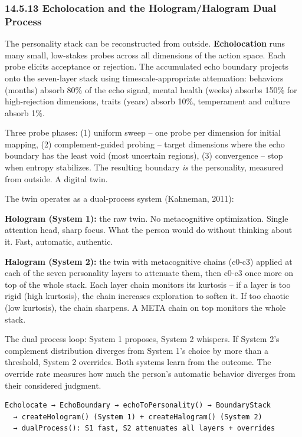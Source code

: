 \documentclass[
  11pt,
]{article}
\begin{document}
\subsubsection{14.5.13 Echolocation and the Hologram/Halogram Dual
Process}\label{echolocation-and-the-hologramhalogram-dual-process}

The personality stack can be reconstructed from outside.
\textbf{Echolocation} runs many small, low-stakes probes across all
dimensions of the action space. Each probe elicits acceptance or
rejection. The accumulated echo boundary projects onto the seven-layer
stack using timescale-appropriate attenuation: behaviors (months) absorb
80\% of the echo signal, mental health (weeks) absorbs 150\% for
high-rejection dimensions, traits (years) absorb 10\%, temperament and
culture absorb 1\%.

Three probe phases: (1) uniform sweep -- one probe per dimension for
initial mapping, (2) complement-guided probing -- target dimensions
where the echo boundary has the least void (most uncertain regions), (3)
convergence -- stop when entropy stabilizes. The resulting boundary
\emph{is} the personality, measured from outside. A digital twin.

The twin operates as a dual-process system (Kahneman, 2011):

\textbf{Hologram (System 1):} the raw twin. No metacognitive
optimization. Single attention head, sharp focus. What the person would
do without thinking about it. Fast, automatic, authentic.

\textbf{Halogram (System 2):} the twin with metacognitive chains (c0-c3)
applied at each of the seven personality layers to attenuate them, then
c0-c3 once more on top of the whole stack. Each layer chain monitors its
kurtosis -- if a layer is too rigid (high kurtosis), the chain increases
exploration to soften it. If too chaotic (low kurtosis), the chain
sharpens. A META chain on top monitors the whole stack.

The dual process loop: System 1 proposes, System 2 whispers. If System
2's complement distribution diverges from System 1's choice by more than
a threshold, System 2 overrides. Both systems learn from the outcome.
The override rate measures how much the person's automatic behavior
diverges from their considered judgment.

\begin{verbatim}
Echolocate → EchoBoundary → echoToPersonality() → BoundaryStack
  → createHologram() (System 1) + createHalogram() (System 2)
  → dualProcess(): S1 fast, S2 attenuates all layers + overrides
\end{verbatim}
\end{document}
